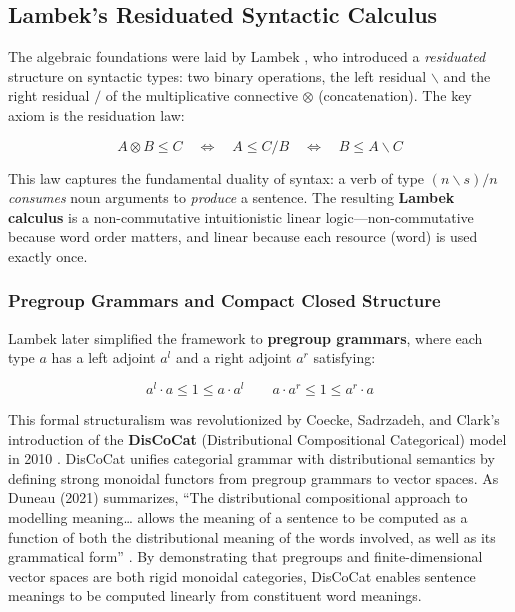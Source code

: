 \documentclass[
]{article}
\numberwithin{equation}{section}
\begin{document}
\subsection{Lambek's Residuated Syntactic
Calculus}\label{lambeks-residuated-syntactic-calculus}

The algebraic foundations were laid by Lambek
\citeyearpar{lambek1958mathematics}, who introduced a \emph{residuated}
structure on syntactic types: two binary operations, the left residual
\(\backslash\) and the right residual \(/\) of the multiplicative
connective \(\otimes\) (concatenation). The key axiom is the residuation
law:

\[A \otimes B \leq C \quad \iff \quad A \leq C / B \quad \iff \quad B \leq A \backslash C \tag{3.1}\]

This law captures the fundamental duality of syntax: a verb of type
\((n \backslash s) / n\) \emph{consumes} noun arguments to
\emph{produce} a sentence. The resulting \textbf{Lambek calculus} is a
non-commutative intuitionistic linear logic---non-commutative because
word order matters, and linear because each resource (word) is used
exactly once.

\subsubsection{Pregroup Grammars and Compact Closed
Structure}\label{pregroup-grammars-and-compact-closed-structure}

Lambek \citeyearpar{lambek2004fine} later simplified the framework to
\textbf{pregroup grammars}, where each type \(a\) has a left adjoint
\(a^l\) and a right adjoint \(a^r\) satisfying:

\[a^l \cdot a \leq 1 \leq a \cdot a^l \qquad a \cdot a^r \leq 1 \leq a^r \cdot a \tag{3.2}\]

This formal structuralism was revolutionized by Coecke, Sadrzadeh, and
Clark's introduction of the \textbf{DisCoCat} (Distributional
Compositional Categorical) model in 2010
\citeyearpar{coecke2010mathematical}. DisCoCat unifies categorial
grammar with distributional semantics by defining strong monoidal
functors from pregroup grammars to vector spaces. As Duneau (2021)
summarizes, ``The distributional compositional approach to modelling
meaning\ldots{} allows the meaning of a sentence to be computed as a
function of both the distributional meaning of the words involved, as
well as its grammatical form'' \citeyearpar{duneau2021parsing}. By
demonstrating that pregroups and finite-dimensional vector spaces are
both rigid monoidal categories, DisCoCat enables sentence meanings to be
computed linearly from constituent word meanings.
\end{document}
